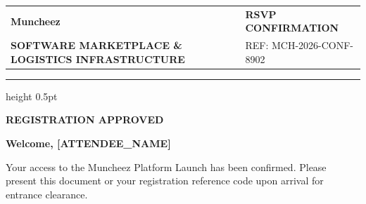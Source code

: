 \documentclass[11pt,a4paper]{article}
\begin{document}
\begin{tabularx}{\textwidth}{@{} X >{\raggedleft\arraybackslash}X @{}}
    {\fontsize{36}{42}\sffamily\bfseries\color{CorporateNavy} Muncheez\color{LinkBlue}{\textbf{.}}} & 
    \textsf{\small\bfseries\color{LinkBlue} RSVP CONFIRMATION} \\
    {\textsf{\scriptsize\bfseries\color{SolidBlack} SOFTWARE MARKETPLACE \& LOGISTICS INFRASTRUCTURE}} & 
    \textsf{\scriptsize\color{SlateGray} REF: MCH-2026-CONF-8902} \\
\end{tabularx}

\vspace{0.6cm}
\color{BorderGray}\hrule height 0.5pt
\vspace{1cm}

\textsf{\scriptsize\bfseries\color{LinkBlue}\uppercase{Registration Approved}}

\vspace{0.2cm}
{\fontsize{28}{34}\sffamily\bfseries\color{CorporateNavy} Welcome, [ATTENDEE\_NAME]}

\vspace{0.4cm}
\textsf{\small\color{SlateGray} Your access to the Muncheez Platform Launch has been confirmed. Please present this document or your registration reference code upon arrival for entrance clearance.}

\vspace{1.2cm}
\end{document}

